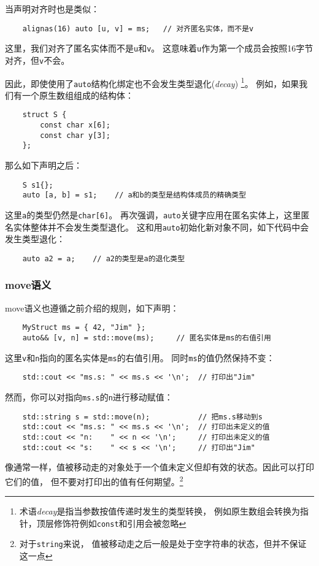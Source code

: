 当声明对齐时也是类似：
\begin{lstlisting}
    alignas(16) auto [u, v] = ms;   // 对齐匿名实体，而不是v
\end{lstlisting}
这里，我们对齐了匿名实体而不是\texttt{u}和\texttt{v}。
这意味着\texttt{u}作为第一个成员会按照16字节对齐，但\texttt{v}不会。

因此，即使使用了\texttt{auto}结构化绑定也不会发生类型退化(\emph{decay})
\footnote{术语\emph{decay}是指当参数按值传递时发生的类型转换，
例如原生数组会转换为指针，顶层修饰符例如\texttt{const}和引用会被忽略}。
例如，如果我们有一个原生数组组成的结构体：
\begin{lstlisting}
    struct S {
        const char x[6];
        const char y[3];
    };
\end{lstlisting}
那么如下声明之后：
\begin{lstlisting}
    S s1{};
    auto [a, b] = s1;    // a和b的类型是结构体成员的精确类型
\end{lstlisting}
这里\texttt{a}的类型仍然是\texttt{char[6]}。
再次强调，\texttt{auto}关键字应用在匿名实体上，这里匿名实体整体并不会发生类型退化。
这和用\texttt{auto}初始化新对象不同，如下代码中会发生类型退化：
\begin{lstlisting}
    auto a2 = a;    // a2的类型是a的退化类型
\end{lstlisting}

\subsubsection{move语义}
move语义也遵循之前介绍的规则，如下声明：
\begin{lstlisting}
    MyStruct ms = { 42, "Jim" };
    auto&& [v, n] = std::move(ms);     // 匿名实体是ms的右值引用
\end{lstlisting}
这里\texttt{v}和\texttt{n}指向的匿名实体是\texttt{ms}的右值引用。
同时\texttt{ms}的值仍然保持不变：
\begin{lstlisting}
    std::cout << "ms.s: " << ms.s << '\n';  // 打印出"Jim"
\end{lstlisting}
然而，你可以对指向\texttt{ms.s}的\texttt{n}进行移动赋值：
\begin{lstlisting}
    std::string s = std::move(n);           // 把ms.s移动到s
    std::cout << "ms.s: " << ms.s << '\n';  // 打印出未定义的值
    std::cout << "n:    " << n << '\n';     // 打印出未定义的值
    std::cout << "s:    " << s << '\n';     // 打印出"Jim"
\end{lstlisting}
像通常一样，值被移动走的对象处于一个值未定义但却有效的状态。因此可以打印它们的值，
但不要对打印出的值有任何期望。\footnote{对于\texttt{string}来说，
值被移动走之后一般是处于空字符串的状态，但并不保证这一点}


